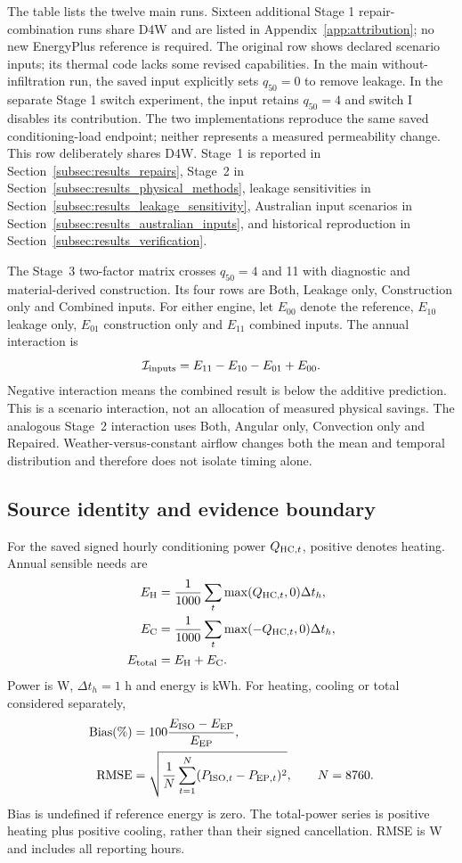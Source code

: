 The table lists the twelve main runs. Sixteen additional Stage 1 repair-combination runs share D4W and are listed in Appendix~\ref{app:attribution}; no new EnergyPlus reference is required. The original row shows declared scenario inputs; its thermal code lacks some revised capabilities. In the main without-infiltration run, the saved input explicitly sets $q_{50}=0$ to remove leakage. In the separate Stage 1 switch experiment, the input retains $q_{50}=4$ and switch I disables its contribution. The two implementations reproduce the same saved conditioning-load endpoint; neither represents a measured permeability change. This row deliberately shares D4W. Stage~1 is reported in Section~\ref{subsec:results_repairs}, Stage~2 in Section~\ref{subsec:results_physical_methods}, leakage sensitivities in Section~\ref{subsec:results_leakage_sensitivity}, Australian input scenarios in Section~\ref{subsec:results_australian_inputs}, and historical reproduction in Section~\ref{subsec:results_verification}.

The Stage~3 two-factor matrix crosses $q_{50}=4$ and 11 with diagnostic and material-derived construction. Its four rows are Both, Leakage only, Construction only and Combined inputs. For either engine, let $E_{00}$ denote the reference, $E_{10}$ leakage only, $E_{01}$ construction only and $E_{11}$ combined inputs. The annual interaction is
\begin{equation}
\mathcal I_{\rm inputs}=E_{11}-E_{10}-E_{01}+E_{00}.
\end{equation}
Negative interaction means the combined result is below the additive prediction. This is a scenario interaction, not an allocation of measured physical savings. The analogous Stage~2 interaction uses Both, Angular only, Convection only and Repaired. Weather-versus-constant airflow changes both the mean and temporal distribution and therefore does not isolate timing alone.

\subsection{Source identity and evidence boundary}
\label{app:provenance}
For the saved signed hourly conditioning power $Q_{{\rm HC},t}$, positive denotes heating. Annual sensible needs are
\begin{align}
E_{\rm H}&=\frac{1}{1000}\sum_t\max(Q_{{\rm HC},t},0)\Delta t_h,\\
E_{\rm C}&=\frac{1}{1000}\sum_t\max(-Q_{{\rm HC},t},0)\Delta t_h,\\
E_{\rm total}&=E_{\rm H}+E_{\rm C}.
\end{align}
Power is W, $\Delta t_h=1$ h and energy is kWh. For heating, cooling or total considered separately,
\begin{align}
\mathrm{Bias}(\%)&=100\frac{E_{\rm ISO}-E_{\rm EP}}{E_{\rm EP}},\\
\mathrm{RMSE}&=\sqrt{\frac{1}{N}\sum_{t=1}^{N}(P_{{\rm ISO},t}-P_{{\rm EP},t})^2},\qquad N=8760.
\end{align}
Bias is undefined if reference energy is zero. The total-power series is positive heating plus positive cooling, rather than their signed cancellation. RMSE is W and includes all reporting hours.

